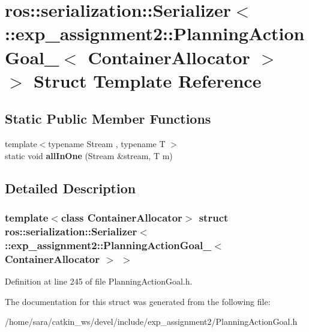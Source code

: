 \hypertarget{structros_1_1serialization_1_1Serializer_3_01_1_1exp__assignment2_1_1PlanningActionGoal___3_01ContainerAllocator_01_4_01_4}{}\section{ros\+:\+:serialization\+:\+:Serializer$<$ \+:\+:exp\+\_\+assignment2\+:\+:Planning\+Action\+Goal\+\_\+$<$ Container\+Allocator $>$ $>$ Struct Template Reference}
\label{structros_1_1serialization_1_1Serializer_3_01_1_1exp__assignment2_1_1PlanningActionGoal___3_01ContainerAllocator_01_4_01_4}
\subsection*{Static Public Member Functions}
\begin{DoxyCompactItemize}
\item 
\mbox{\label{structros_1_1serialization_1_1Serializer_3_01_1_1exp__assignment2_1_1PlanningActionGoal___3_01ContainerAllocator_01_4_01_4_a3e0f8c09c8cadb436f187670b9450ec6}} 
{\footnotesize template$<$typename Stream , typename T $>$ }\\static void {\bfseries all\+In\+One} (Stream \&stream, T m)
\end{DoxyCompactItemize}


\subsection{Detailed Description}
\subsubsection*{template$<$class Container\+Allocator$>$\newline
struct ros\+::serialization\+::\+Serializer$<$ \+::exp\+\_\+assignment2\+::\+Planning\+Action\+Goal\+\_\+$<$ Container\+Allocator $>$ $>$}



Definition at line 245 of file Planning\+Action\+Goal.\+h.



The documentation for this struct was generated from the following file\+:\begin{DoxyCompactItemize}
\item 
/home/sara/catkin\+\_\+ws/devel/include/exp\+\_\+assignment2/Planning\+Action\+Goal.\+h\end{DoxyCompactItemize}
